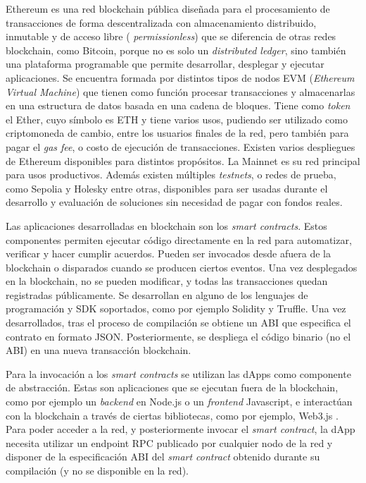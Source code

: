 Ethereum \citep{ethereum} es una red blockchain pública diseñada para el procesamiento de transacciones de forma descentralizada con almacenamiento distribuido, inmutable y de acceso libre ( \textit{permissionless}) que se diferencia de otras redes blockchain, como Bitcoin, porque no es solo un \textit{distributed ledger}, sino también una plataforma programable que permite desarrollar, desplegar y ejecutar aplicaciones. Se encuentra formada por distintos tipos de nodos EVM (\textit{Ethereum Virtual Machine}) \citep{evm} que tienen como función procesar transacciones y almacenarlas en una estructura de datos basada en una cadena de bloques. Tiene como \textit{token} el Ether, cuyo símbolo es ETH y tiene varios usos, pudiendo ser utilizado como criptomoneda de cambio, entre los usuarios finales de la red, pero también para pagar el \textit{gas fee}, o costo de ejecución de transacciones. 
Existen varios despliegues de Ethereum disponibles para distintos propósitos. La Mainnet \citep{mainnet} es su red principal para usos productivos. Además existen múltiples \textit{testnets}, o redes de prueba, como Sepolia \citep{sepolia} y Holesky \citep{holesky} entre otras, disponibles para ser usadas durante el desarrollo y evaluación de soluciones sin necesidad de pagar con fondos reales. 


Las aplicaciones desarrolladas en blockchain son los \textit{smart contracts}. Estos componentes permiten ejecutar código directamente en la red para automatizar, verificar y hacer cumplir acuerdos. Pueden ser invocados desde afuera de la blockchain o disparados cuando se producen ciertos eventos. Una vez desplegados en la blockchain, no se pueden modificar, y todas las transacciones quedan registradas públicamente. 
Se desarrollan en alguno de los lenguajes de programación y SDK soportados, como por ejemplo Solidity y Truffle. Una vez desarrollados, tras el proceso de compilación se obtiene un ABI \citep{abi} que especifica el contrato en formato JSON. Posteriormente, se despliega el código binario (no el ABI) en una nueva transacción blockchain. 

Para la invocación a los \textit{smart contracts} se utilizan las dApps como componente de abstracción. Estas son aplicaciones que se ejecutan fuera de la blockchain, como por ejemplo un \textit{backend} en Node.js o un \textit{frontend} Javascript, e interactúan con la blockchain a través de ciertas bibliotecas, como por ejemplo, Web3.js \citep{web3}. Para poder acceder a la red, y posteriormente invocar el \textit{smart contract}, la dApp necesita utilizar un endpoint RPC publicado por cualquier nodo de la red y disponer de la especificación ABI del \textit{smart contract} obtenido durante su compilación (y no se disponible en la red).

